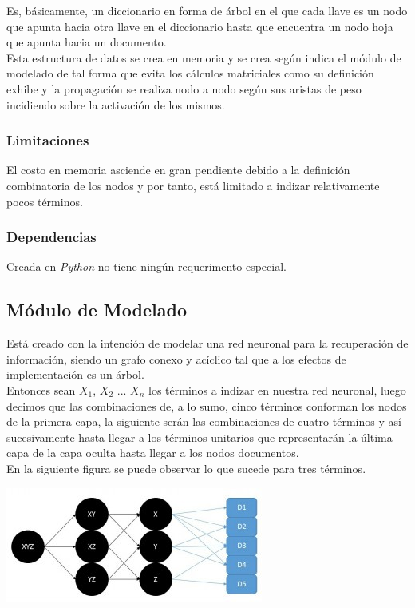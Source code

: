 \documentclass{llncs}
\begin{document}
Es, b\'asicamente, un diccionario en forma de \'arbol en el que cada llave es un nodo que apunta hacia otra llave en el diccionario 
hasta que encuentra un nodo hoja que apunta hacia un documento.\\
Esta estructura de datos se crea en memoria y se crea seg\'un indica el m\'odulo de modelado de tal forma que evita los c\'alculos
matriciales como su definici\'on exhibe y la propagaci\'on se realiza nodo a nodo seg\'un sus aristas de peso incidiendo sobre la
activaci\'on de los mismos.

\subsubsection{Limitaciones}
El costo en memoria asciende en gran pendiente debido a la definici\'on combinatoria de los nodos y por tanto, est\'a limitado a indizar
relativamente pocos t\'erminos.

\subsubsection{Dependencias}

Creada en {\textit{Python}} no tiene ning\'un requerimento especial.

\subsection{M\'odulo de Modelado}

Est\'a creado con la intenci\'on de modelar una red neuronal para la recuperaci\'on de informaci\'on, siendo un grafo conexo y ac\'iclico tal que 
a los efectos de implementaci\'on es un \'arbol.\\
Entonces sean $X_1$, $X_2$ ... $X_n$ los t\'erminos a indizar en nuestra red neuronal, luego decimos que las combinaciones de, a lo sumo,
cinco t\'erminos conforman los nodos de la primera capa, la siguiente ser\'an las combinaciones de cuatro t\'erminos y as\'i sucesivamente
hasta llegar a los t\'erminos unitarios que representar\'an la \'ultima capa de la capa oculta hasta llegar a los nodos documentos.\\
En la siguiente figura se puede observar lo que sucede para tres t\'erminos.

{\includegraphics[]{model}}
{\hfil{}}
\end{document}
